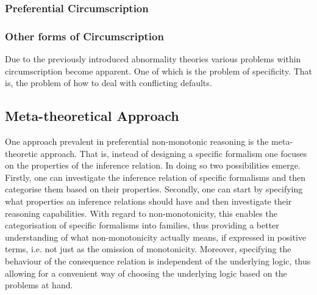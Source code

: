 \documentclass{article}
\begin{document}
\begin{comment}
There has to be made a distinction between how information might invalidate an argument. 
The first one is this kind of information that directly contradicts an inference. For example, if it is assumed that birds normally fly and someone states that Tweety does not fly, the assumption made is directly contradicted. 
The second one is the kind of information, that contradicts an argument, on which the assumption is based. That is, it undermined the argument on which the assumption is based. For example, if it is assumed that normally all small birds fly and someone states that Tweety is a big bird, i.e. not a small bird. It becomes impossible to use the default assumption, even though it might actually be the case that Tweety can fly. 
\end{comment}

\subsubsection*{Preferential Circumscription}


\subsubsection*{Other forms of Circumscription}
Due to the previously introduced abnormality theories various problems within circumscription become apparent. One of which is the problem of specificity.
That is, the problem of how to deal with conflicting defaults.
 




\subsection{Meta-theoretical Approach}
One approach prevalent in preferential non-monotonic reasoning is the meta-theoretic approach. That is, instead of designing a specific formalism one focuses on the properties of the inference relation.
In doing so two possibilities emerge. Firstly, one can investigate the inference relation of specific formalisms and then categorise them based on their properties. Secondly, one can start by specifying what properties an inference relations should have and then investigate their reasoning capabilities.  
With regard to non-monotonicity, this enables the categorisation of specific formalisms into families, thus providing a better understanding of what non-monotonicity actually means, if expressed in positive terms, i.e. not just as the omission of monotonicity.
Moreover, specifying the behaviour of the consequence relation is independent of the underlying logic, thus allowing for a convenient way of choosing the underlying logic based on the problems at hand.  \cite{BOCHMAN2007557,kraus1990nonmonotonic,brewka1997nonmonotonic}   \\
\end{document}
